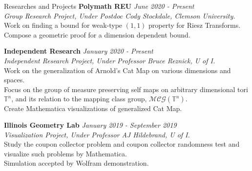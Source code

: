 \documentclass{cv} %
\begin{document}
\begin{rSection}{Researches and Projects}
{\bf Polymath REU} \hfill {\em June 2020 - Present}
\\ {\em Group Research Project, Under Postdoc Cody Stockdale, Clemson University.}
\\ \textbullet{} Work on finding a bound for weak-type $(1,1)$ property for Riesz Transforms.
\\ \textbullet{} Compose a geometric proof for a dimension dependent bound.

{\bf Independent Research} \hfill {\em January 2020 - Present}
\\ {\em Independent Research Project, Under Professor Bruce Reznick, U of I.}
\\ \textbullet{} Work on the generalization of Arnold's Cat Map on various dimensions and spaces.
\\ \textbullet{} Focus on the group of measure preserving self maps on arbitrary dimensional tori $\mathbb{T}^n$, and its relation to the mapping class group, $\mathcal{MCG}(\mathbb{T}^n)$.
\\ \textbullet{} Create Mathematica visualizations of generalized Cat Map.

{\bf Illinois Geometry Lab} \hfill {\em January 2019 - September 2019}
\\ {\em Visualization Project, Under Professor AJ Hildebrand, U of I.}
\\ \textbullet{} Study the coupon collector problem and coupon collector randomness test and visualize such problems by Mathematica.
\\ \textbullet{} Simulation accepted by Wolfram demonstration.


\end{rSection}






\end{document}
